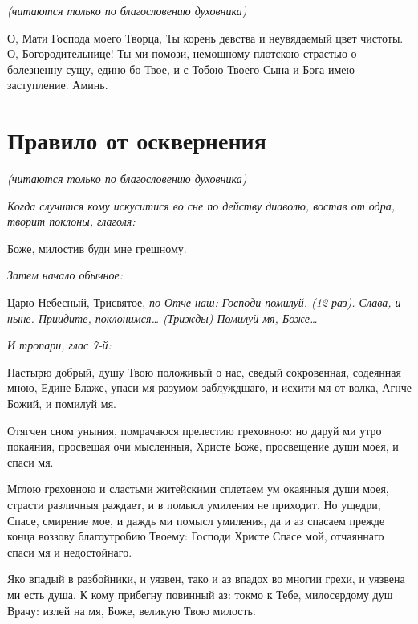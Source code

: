\itshape (читаются только по благословению духовника)

\normalfont{}


О, Мати Господа моего Творца, Ты корень девства и неувядаемый цвет чистоты. О, Богородительнице! Ты ми помози, немощному плотскою страстью о болезненну сущу, едино бо Твое, и с Тобою Твоего Сына и Бога имею заступление. Аминь.





\section{Правило от осквернения}
 


\itshape (читаются только по благословению духовника)\normalfont{}


\itshape Когда случится кому искуситися во сне по действу диаволю, востав от одра, творит поклоны, глаголя: 

\normalfont{}

Боже, милостив буди мне грешному.


\itshape Затем начало обычное: 

\normalfont{}Царю Небесный, Трисвятое, \itshape по\normalfont{} Отче наш: Господи помилуй. (12 раз). Слава, и ныне. Приидите, поклонимся… (\itshape Трижды\normalfont{}) Помилуй мя, Боже…


\itshape И тропари, глас 7-й: \normalfont{}

Пастырю добрый, душу Твою положивый о нас, сведый сокровенная, содеянная мною, Едине Блаже, упаси мя разумом заблуждшаго, и исхити мя от волка, Агнче Божий, и помилуй мя. 


Отягчен сном уныния, помрачаюся прелестию греховною: но даруй ми утро покаяния, просвещая очи мысленныя, Христе Боже, просвещение души моея, и спаси мя. 


Мглою греховною и сластьми житейскими сплетаем ум окаянныя души моея, страсти различныя раждает, и в помысл умиления не приходит. Но ущедри, Спасе, смирение мое, и даждь ми помысл умиления, да и аз спасаем прежде конца воззову благоутробию Твоему: Господи Христе Спасе мой, отчаяннаго спаси мя и недостойнаго. 


Яко впадый в разбойники, и уязвен, тако и аз впадох во многии грехи, и уязвена ми есть душа. К кому прибегну повинный аз: токмо к Тебе, милосердому душ Врачу: излей на мя, Боже, великую Твою милость. 


